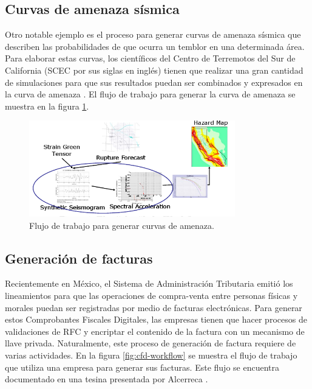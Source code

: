 \subsection{Curvas de amenaza sísmica}
Otro notable ejemplo es el proceso para generar curvas de amenaza sísmica que describen las probabilidades de que ocurra un temblor en una determinada área. Para elaborar estas curvas, los científicos del Centro de Terremotos del Sur de California (SCEC por sus siglas en inglés) tienen que realizar una gran cantidad de simulaciones para que sus resultados puedan ser combinados y expresados en la curva de amenaza \cite{deelman2006managing}. El flujo de trabajo para generar la curva de amenaza se muestra en la figura \ref{fig:scec-workflow}.

\begin{figure}
    \begin{center}
        \includegraphics[width=0.8\textwidth]{imagenes/scec-workflow}
    \end{center}
    \caption{Flujo de trabajo para generar curvas de amenaza.}
    \label{fig:scec-workflow}
\end{figure}

\subsection{Generación de facturas}
Recientemente en México, el Sistema de Administración Tributaria emitió los lineamientos para que las operaciones de compra-venta entre personas físicas y morales puedan ser registradas por medio de facturas electrónicas. Para generar estos Comprobantes Fiscales Digitales, las empresas tienen que hacer procesos de validaciones de RFC y encriptar el contenido de la factura con un mecanismo de llave privada. Naturalmente, este proceso de generación de factura requiere de varias actividades. En la figura \ref{fig:cfd-workflow} se muestra el flujo de trabajo que utiliza una empresa para generar sus facturas. Este flujo se encuentra documentado en una tesina presentada por Alcerreca \cite{alcerreca2013cfd}.

